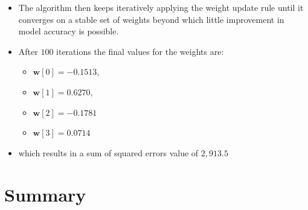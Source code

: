 \documentclass[xcolor={table}]{beamer}
\begin{document}
\begin{frame}
\begin{itemize}
\item The algorithm then keeps iteratively applying the weight update rule  until it converges on a stable set of weights beyond which little improvement in model accuracy is possible. 
\item After $100$ iterations the final values for the weights are:
\begin{itemize}
\item  $\mathbf{w}[0] = -0.1513$, 
\item $\mathbf{w}[1] = 0.6270$,
\item  $\mathbf{w}[2] = -0.1781$
\item $\mathbf{w}[3] = 0.0714$ 
\end{itemize}
\item which results in a sum of squared errors value of $2,913.5$
\end{itemize}
\end{frame}

\section{Summary}

\begin{frame}
	\tableofcontents
\end{frame}
\end{document}
